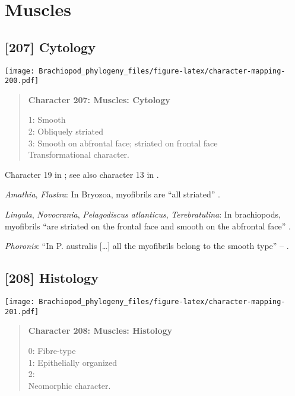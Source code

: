 \documentclass[openany]{book}
\theoremstyle{definition}
\theoremstyle{definition}
\theoremstyle{definition}
\theoremstyle{remark}
\begin{document}
\section{Muscles}\label{muscles}

\subsection*{{[}207{]} Cytology}\label{cytology}

\texttt{[image: Brachiopod\_phylogeny\_files/figure-latex/character-mapping-200.pdf]}

\begin{quote}
\textbf{Character 207: Muscles: Cytology}

1: Smooth\\
2: Obliquely striated\\
3: Smooth on abfrontal face; striated on frontal face\\
Transformational character.
\end{quote}

Character 19 in \citet{Haszprunar1996}; see also character 13 in
\citet{Haszprunar2000}.

\hypertarget{Amathia-coding-207}{}
\emph{Amathia}, \emph{Flustra}: In Bryozoa, myofibrils are ``all
striated'' \citep{Pardos1991}.

\hypertarget{Lingula-coding-207}{}
\emph{Lingula}, \emph{Novocrania}, \emph{Pelagodiscus atlanticus},
\emph{Terebratulina}: In brachiopods, myofibrils ``are striated on the
frontal face and smooth on the abfrontal face'' \citep{Pardos1991}.

\hypertarget{Phoronis-coding-207}{}
\emph{Phoronis}: ``In P. australis {[}\ldots{}{]} all the myofibrils
belong to the smooth type'' -- \citet{Pardos1991}.

\subsection*{{[}208{]} Histology}\label{histology}

\texttt{[image: Brachiopod\_phylogeny\_files/figure-latex/character-mapping-201.pdf]}

\begin{quote}
\textbf{Character 208: Muscles: Histology}

0: Fibre-type\\
1: Epithelially organized\\
2:\\
Neomorphic character.
\end{quote}
\end{document}
